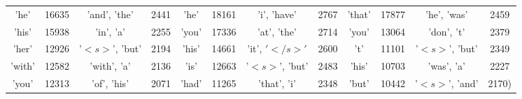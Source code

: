 \documentclass{article}
\begin{document}
\begin{itemize}
\begin{table}[h]
\begin{adjustbox}{width=\columnwidth,center}
\begin{tabular}{|c c| c c|| c c| c c|| c c| c c |}
	'he'& 16635&'and', 'the'& 2441&'he'& 18161&'i', 'have'& 2767&'that'& 17877&'he', 'was'& 2459\\
	'his'& 15938&'in', 'a'& 2255&'you'& 17336&'at', 'the'& 2714&'you'& 13064&'don', 't'& 2379\\
	'her'& 12926&'$<s>$', 'but'& 2194&'his'& 14661&'it', $'</s>'$& 2600&'t'& 11101&'$<s>$', 'but'& 2349\\
	'with'& 12582&'with', 'a'& 2136&'is'& 12663&'$<s>$', 'but'& 2483&'his'& 10703&'was', 'a'& 2227\\
	'you'& 12313&'of', 'his'& 2071&'had'& 11265&'that', 'i'& 2348&'but'& 10442&'$<s>$', 'and'& 2170)\\\hline

\end{tabular}
\end{adjustbox}
\end{table}
\end{itemize}
\end{document}
